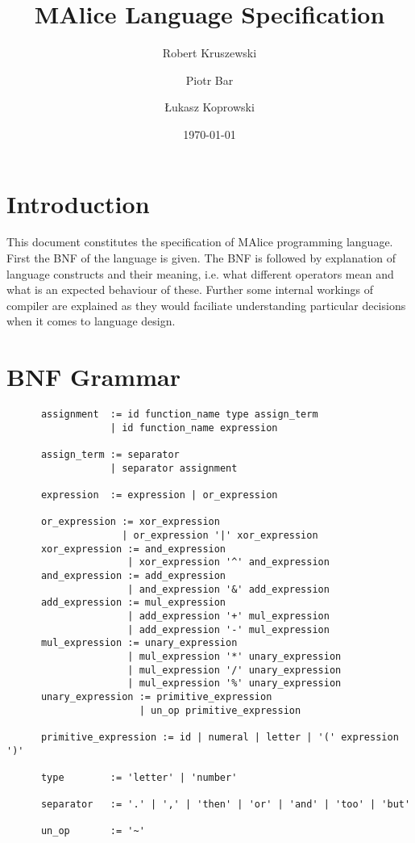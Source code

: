 \documentclass[a4wide, 11pt]{article}
\begin{document}
\title{MAlice Language Specification}

\author{Robert Kruszewski \and Piotr Bar \and Łukasz Koprowski}


\date{\today}         %

\maketitle            %

\section{Introduction}

This document constitutes the specification of MAlice programming language.
First the BNF of the language is given. The BNF is followed by explanation
of language constructs and their meaning, i.e. what different operators mean
and what is an expected behaviour of these. Further some internal workings of compiler
are explained as they would faciliate understanding particular decisions when
it comes to language design.

\section{BNF Grammar} 

\begin{verbatim}
      assignment  := id function_name type assign_term
                  | id function_name expression 

      assign_term := separator
                  | separator assignment

      expression  := expression | or_expression

      or_expression := xor_expression
                    | or_expression '|' xor_expression
      xor_expression := and_expression
                     | xor_expression '^' and_expression 
      and_expression := add_expression
                     | and_expression '&' add_expression
      add_expression := mul_expression
                     | add_expression '+' mul_expression
                     | add_expression '-' mul_expression
      mul_expression := unary_expression
                     | mul_expression '*' unary_expression
                     | mul_expression '/' unary_expression
                     | mul_expression '%' unary_expression
      unary_expression := primitive_expression
                       | un_op primitive_expression

      primitive_expression := id | numeral | letter | '(' expression ')'

      type        := 'letter' | 'number'

      separator   := '.' | ',' | 'then' | 'or' | 'and' | 'too' | 'but'

      un_op       := '~'
\end{verbatim}
\end{document}
